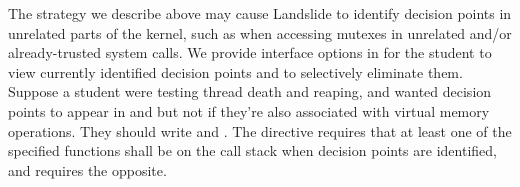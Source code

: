 The strategy we describe above may cause Landslide to identify decision points in unrelated parts of the kernel, such as when accessing mutexes in unrelated and/or already-trusted system calls.
We provide interface options in  for the student to view currently identified decision points and to selectively eliminate them.
Suppose a student were testing thread death and reaping, and wanted decision points to appear in  and  but not if they're also associated with virtual memory operations.
They should write  and  .
The  directive requires that at least one of the specified functions shall be on the call stack when decision points are identified, and  requires the opposite.


%

